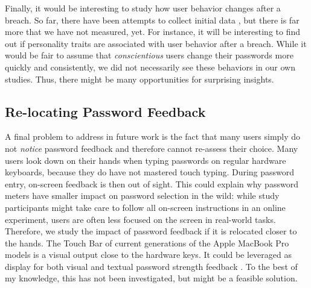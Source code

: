 Finally, it would be interesting to study how user behavior changes after a breach. So far, there have been attempts to collect initial data \cite{Huh2017TooBusy}, but there is far more that we have not measured, yet. For instance, it will be interesting to find out if personality traits are associated with user behavior after a breach. While it would be fair to assume that \textit{conscientious} users change their passwords more quickly and consistently, we did not necessarily see these behaviors in our own studies. Thus, there might be many opportunities for surprising insights.

\subsection{Re-locating Password Feedback} 
A final problem to address in future work is the fact that many users simply do not \textit{notice} password feedback and therefore cannot re-assess their choice. 
Many users look down on their hands when typing passwords on regular hardware keyboards, because they do have not mastered touch typing. During password entry, on-screen feedback is then out of sight. 
This could explain why password meters have smaller impact on password selection in the wild: while study participants might take care to follow all on-screen instructions in an online experiment, users are often less focused on the screen in real-world tasks. 
Therefore, we study the impact of password feedback if it is relocated closer to the hands. 
The Touch Bar of current generations of the Apple MacBook Pro models is a visual output close to the hardware keys. It could be leveraged as display for both visual and textual password strength feedback . To the best of my knowledge, this has not been investigated, but might be a feasible solution. 



